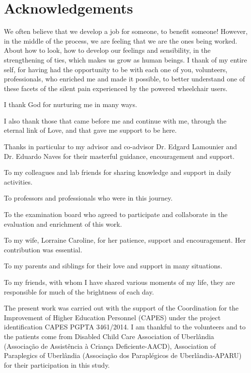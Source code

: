 \newpage
\thispagestyle{empty}
\chapter*{Acknowledgements}

We often believe that we develop a job for someone, to benefit someone! However, in the middle of the process, we are feeling that we are the ones being worked. About how to look, how to develop our feelings and sensibility, in the strengthening of ties, which makes us grow as human beings. I thank of my entire self, for having had the opportunity to be with each one of you, volunteers, professionals, who enriched me and made it possible, to better understand one of these facets of the silent pain experienced by the powered wheelchair users.

I thank God for nurturing me in many ways.

I also thank those that came before me and continue with me, through the eternal link of Love, and that gave me support to be here.

Thanks in particular to my advisor and co-advisor Dr. Edgard Lamounier and Dr. Eduardo Naves for their masterful guidance, encouragement and support.

To my colleagues and lab friends for sharing knowledge and support in daily activities.

To professors and professionals who were in this journey.

To the examination board who agreed to participate and collaborate in the evaluation
and enrichment of this work.

To my wife, Lorraine Caroline, for her patience, support and encouragement. Her
contribution was essential.

To my parents and siblings for their love and support in many situations.

To my friends, with whom I have shared various moments of my life, they are responsible for much of the brightness of each day.

The present work was carried out with the support of the Coordination for the Improvement of
Higher Education Personnel (CAPES) under the project identification CAPES PGPTA 3461/2014. I am thankful to the volunteers and to the patients come from Disabled Child Care Association of Uberlândia (Associação de Assistência à Criança Deficiente-AACD), Association of Paraplegics of Uberlândia (Associação dos Paraplégicos de Uberlândia-APARU) for their participation in this study.


